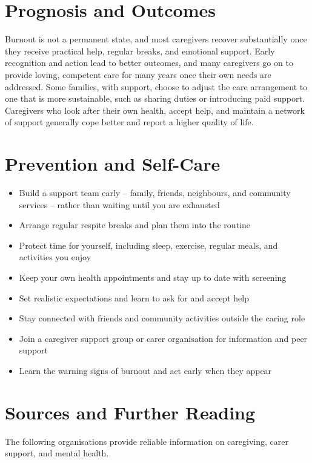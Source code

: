 \section*{Prognosis and Outcomes}
Burnout is not a permanent state, and most caregivers recover substantially once they receive practical help, regular breaks, and emotional support. Early recognition and action lead to better outcomes, and many caregivers go on to provide loving, competent care for many years once their own needs are addressed. Some families, with support, choose to adjust the care arrangement to one that is more sustainable, such as sharing duties or introducing paid support. Caregivers who look after their own health, accept help, and maintain a network of support generally cope better and report a higher quality of life.

\section*{Prevention and Self-Care}
\begin{itemize}
    \item Build a support team early -- family, friends, neighbours, and community services -- rather than waiting until you are exhausted
    \item Arrange regular respite breaks and plan them into the routine
    \item Protect time for yourself, including sleep, exercise, regular meals, and activities you enjoy
    \item Keep your own health appointments and stay up to date with screening
    \item Set realistic expectations and learn to ask for and accept help
    \item Stay connected with friends and community activities outside the caring role
    \item Join a caregiver support group or carer organisation for information and peer support
    \item Learn the warning signs of burnout and act early when they appear
\end{itemize}

\section*{Sources and Further Reading}
The following organisations provide reliable information on caregiving, carer support, and mental health.

